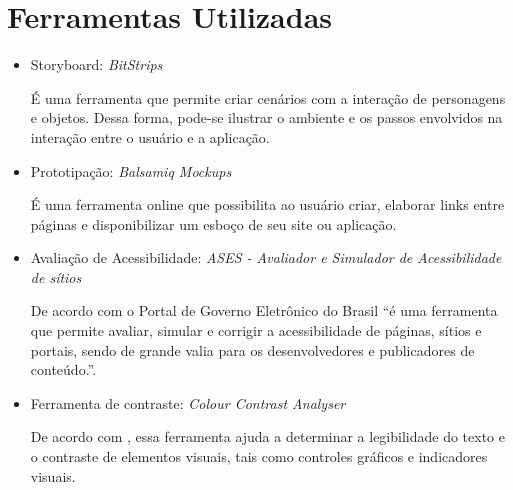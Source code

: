 \chapter[Ferramentas]{Ferramentas Utilizadas}

\begin{itemize}
  \item Storyboard: \textit{BitStrips}
  
  \subitem É uma ferramenta que permite criar cenários com a interação de personagens e objetos. Dessa forma, pode-se ilustrar o ambiente e os passos envolvidos na interação entre o usuário e a aplicação.
  
  \item Prototipação: \textit{Balsamiq Mockups}
  
  \subitem É uma ferramenta online que possibilita ao usuário criar, elaborar links entre páginas e disponibilizar um esboço de seu site ou aplicação.
  
  \item Avaliação de Acessibilidade: \textit{ASES - Avaliador e Simulador de Acessibilidade de sítios}
  
  \subitem De acordo com o Portal de Governo Eletrônico	do Brasil “é uma ferramenta que permite avaliar, simular e corrigir a acessibilidade de páginas, sítios e 
  portais, sendo de grande valia para os desenvolvedores e publicadores de conteúdo.”. \cite{brasil} 
  
  \item Ferramenta de contraste: \textit{Colour Contrast Analyser}
  
  \subitem De acordo com , essa ferramenta ajuda a determinar a legibilidade do texto e o 
  contraste de elementos visuais, tais como controles gráficos e indicadores visuais.
\end{itemize}

